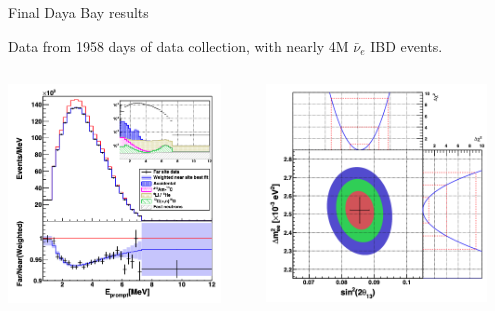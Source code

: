 \begin{frame}{Final Daya Bay results}

Data from 1958 days of data collection, with nearly 4M $\bar{\nu}_e$ IBD events.

\vspace{0.1cm}

\begin{columns}
  \begin{column}{0.50\textwidth}
    \centering
     \includegraphics[width=0.90\textwidth]{./images/3nu/reactor/daya_bay_final_2018_spectrum}\\
  \end{column}
  \begin{column}{0.50\textwidth}
    \centering
     \includegraphics[width=0.90\textwidth]{./images/3nu/reactor/daya_bay_final_2018_osc_params}\\
  \end{column}
\end{columns}


\end{frame}
